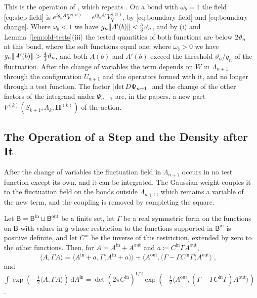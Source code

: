 \documentclass[11pt]{preprint}
\newcommand{\dd}{\mathrm{d}}
\DeclarePairedDelimiter{\abs}{\lvert}{\rvert}
\DeclarePairedDelimiter{\norm}{\lVert}{\rVert}
\numberwithin{equation}{section}
\begin{document}
This is the operation of \cite[p.~269]{BalabanCRE}, which repeats \cite[(1.21)--(1.24), pp.~251--252]{BalabanCRE}. On a bond with $\omega_b = 1$ the field \eqref{eq:step-field} is $e^{ig_nA}V^{(n)} = e^{ig_nA'}V^{(n)}_{\mathsf Y}$, by \eqref{eq:boundary-field} and \eqref{eq:boundary-change}. Where $\omega_b < 1$ we have $g_n\norm{A'(b)} < \frac{5}{3}\vartheta_n$, and by (i) and Lemma~\ref{lem:old-tests}(iii) the tested quantities of both functions are below $2\vartheta_n$ at this bond, where the soft functions equal one; where $\omega_b > 0$ we have $g_n\norm{A'(b)} > \frac{4}{3}\vartheta_n$, and both $A(b)$ and $A'(b)$ exceed the threshold $\vartheta_n/g_n$ of the fluctuation. After the change of variables the term depends on $W$ in $\Lambda_{n+1}$ through the configuration $U_{n+1}$ and the operators formed with it, and no longer through a test function. The factor $\abs{\det D\Psi_{n+1}}$ and the change of the other factors of the integrand under $\Psi_{n+1}$ are, in the papers, a new part $V^{(k)}(S_{k+1}, A_k, \mathbf H^{(k)})$ of the action.

\subsection{The Operation of a Step and the Density after It}\label{sec:step-density}

After the change of variables the fluctuation field in $\Lambda_{n+1}$ occurs in no test function except its own, and it can be integrated. The Gaussian weight couples it to the fluctuation field on the bonds outside $\Lambda_{n+1}$, which remains a variable of the new term, and the coupling is removed by completing the square.

\begin{lemma}\label{lem:gaussian-splitting}
Let $\mathsf B = \mathsf B^{\mathrm{in}} \sqcup \mathsf B^{\mathrm{out}}$ be a finite set, let $\Gamma$ be a real symmetric form on the functions on $\mathsf B$ with values in $\mathfrak g$ whose restriction to the functions supported in $\mathsf B^{\mathrm{in}}$ is positive definite, and let $C^{\mathrm{in}}$ be the inverse of this restriction, extended by zero to the other functions. Then, for $A = A^{\mathrm{in}} + A^{\mathrm{out}}$ and $a \coloneqq C^{\mathrm{in}}\Gamma A^{\mathrm{out}}$,
\begin{equation}\label{eq:gaussian-splitting}
    \langle A, \Gamma A\rangle = \bigl\langle A^{\mathrm{in}} + a, \Gamma\bigl(A^{\mathrm{in}} + a\bigr)\bigr\rangle + \bigl\langle A^{\mathrm{out}}, \bigl(\Gamma - \Gamma C^{\mathrm{in}}\Gamma\bigr)A^{\mathrm{out}}\bigr\rangle\;,
\end{equation}
and $\int\exp(-\frac{1}{2}\langle A, \Gamma A\rangle)\,\dd A^{\mathrm{in}} = \det(2\pi C^{\mathrm{in}})^{1/2}\exp(-\frac{1}{2}\langle A^{\mathrm{out}}, (\Gamma - \Gamma C^{\mathrm{in}}\Gamma)A^{\mathrm{out}}\rangle)$.
\end{lemma}
\end{document}

